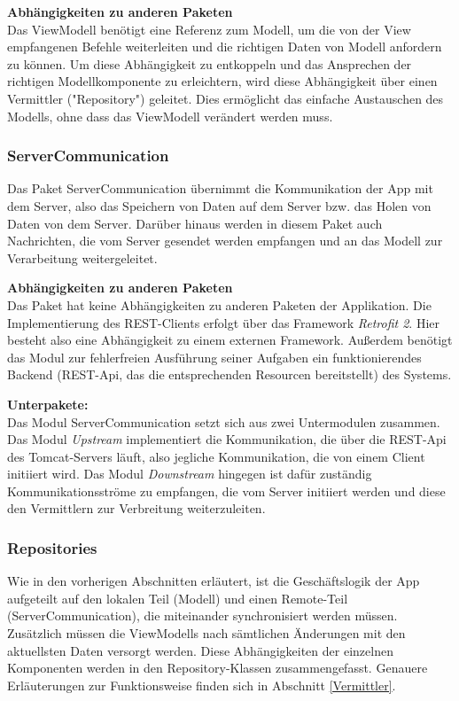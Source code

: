 \documentclass[11pt,a4paper]{article}
\begin{document}
\textbf{Abhängigkeiten zu anderen Paketen}\\
Das ViewModell benötigt eine Referenz zum Modell, um die von der View empfangenen Befehle weiterleiten und die richtigen Daten von Modell anfordern zu können. Um diese Abhängigkeit zu entkoppeln und das Ansprechen der richtigen Modellkomponente zu erleichtern, wird diese Abhängigkeit über einen Vermittler ("Repository") geleitet. Dies ermöglicht das einfache Austauschen des Modells, ohne dass das ViewModell verändert werden muss.

\subsubsection{ServerCommunication}
Das Paket ServerCommunication übernimmt die Kommunikation der App mit dem Server, also das Speichern von Daten auf dem Server bzw. das Holen von Daten von dem Server. Darüber hinaus werden in diesem Paket auch Nachrichten, die vom Server gesendet werden empfangen und an das Modell zur Verarbeitung weitergeleitet.

\textbf{Abhängigkeiten zu anderen Paketen}\\
Das Paket hat keine Abhängigkeiten zu anderen Paketen der Applikation. Die Implementierung des REST-Clients erfolgt über das Framework \textit{Retrofit 2}. Hier besteht also eine Abhängigkeit zu einem externen Framework. Außerdem benötigt das Modul zur fehlerfreien Ausführung seiner Aufgaben ein funktionierendes Backend (REST-Api, das die entsprechenden Resourcen bereitstellt) des Systems.

\textbf{Unterpakete:}\\
Das Modul ServerCommunication setzt sich aus zwei Untermodulen zusammen. Das Modul \textit{Upstream} implementiert die Kommunikation, die über die REST-Api des Tomcat-Servers läuft, also jegliche Kommunikation, die von einem Client initiiert wird. Das Modul \textit{Downstream} hingegen ist dafür zuständig Kommunikationsströme zu empfangen, die vom Server initiiert werden und diese den Vermittlern zur Verbreitung weiterzuleiten.

\subsubsection{Repositories}
Wie in den vorherigen Abschnitten erläutert, ist die Geschäftslogik der App aufgeteilt auf den lokalen Teil (Modell) und einen Remote-Teil (ServerCommunication), die miteinander synchronisiert werden müssen. Zusätzlich müssen die ViewModells nach sämtlichen Änderungen mit den aktuellsten Daten versorgt werden. Diese Abhängigkeiten der einzelnen Komponenten werden in den Repository-Klassen zusammengefasst. Genauere Erläuterungen zur Funktionsweise finden sich in Abschnitt \ref{Vermittler}.
\end{document}
